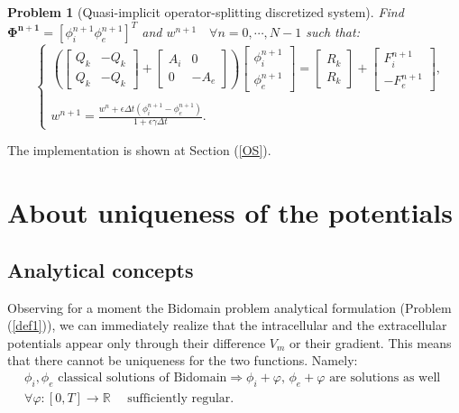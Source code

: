 \documentclass[a4paper,11pt]{article}
\newtheorem{problem}{Problem}
\begin{document}
\begin{problem} [Quasi-implicit operator-splitting discretized system]
Find $\bm{\Phi^{n+1}}=[\phi_i^{n+1} \phi_e^{n+1}]^T$ and $w^{n+1} \quad \forall n=0, \cdots, N-1$ such that:
\begin{equation*}
\quad
\begin{cases}
\left(
\begin{bmatrix} Q_k & -Q_k \\ Q_k & -Q_k \end{bmatrix} + 
\begin{bmatrix} A_i & 0 \\ 0 & -A_e\end{bmatrix}
\right)
\begin{bmatrix}
\phi_i^{n+1} \\ \phi_e^{n+1}
\end{bmatrix}
= \begin{bmatrix} R_k \\ R_k \end{bmatrix} + \begin{bmatrix} F_i^{n+1} \\  -F_e^{n+1}\end{bmatrix},\\ \\
w^{n+1} = \frac{\displaystyle w^n + \epsilon \Delta t (\phi_i^{n+1}-\phi_e^{n+1})}{\displaystyle 1+\epsilon \gamma \Delta t}.
\end{cases}
\end{equation*}
\end{problem}
\vspace{4mm}
\noindent The implementation is shown at Section (\ref{OS}).
\newpage
\section{About uniqueness of the potentials}\label{unique}
\subsection{Analytical concepts}
\noindent Observing for a moment the Bidomain problem analytical formulation (Problem (\ref{def1})), we can immediately realize that the intracellular and the extracellular potentials appear only through their difference $V_m$ or their gradient. This means that there cannot be uniqueness for the two functions. Namely: \vspace{2mm}
\begin{equation}\label{phi_uniqueness}
\begin{gathered}
\phi_i,\phi_e \text{ classical solutions of Bidomain} \Rightarrow \phi_i+\varphi,\,\phi_e+\varphi \text{ are solutions as well } \\
 \forall \varphi: [0,T] \rightarrow \mathbb{R} \quad \text{ sufficiently regular}.
\end{gathered}
\end{equation}
\end{document}
